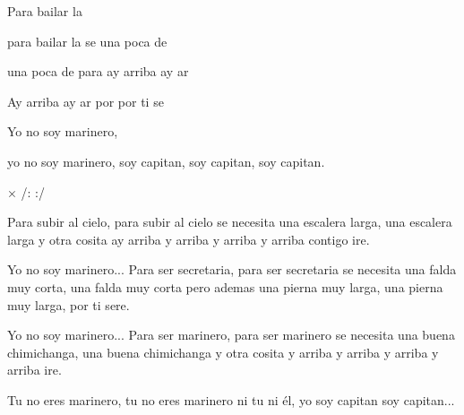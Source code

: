 
\zs
Para bailar la  

para bailar la  se 
una poca de  

una poca de  para  
ay arriba ay ar  

Ay arriba ay ar por 
por ti se 

Yo no soy marinero,

yo no soy marinero, soy capitan,
soy capitan, soy capitan.
\ks

× /:   :/
\kr

\zs
Para subir al cielo,
para subir al cielo se necesita una escalera larga,
una escalera larga y otra cosita ay arriba y arriba
y arriba y arriba contigo ire.

Yo no soy marinero...
\ks
\zr    \kr
\zs
Para ser secretaria,
para ser secretaria se necesita una falda muy corta,
una falda muy corta pero ademas una pierna muy larga,
una pierna muy larga, por ti sere.

Yo no soy marinero...
\ks
\zs
Para ser marinero,
para ser marinero se necesita una buena chimichanga,
una buena chimichanga y otra cosita y arriba y arriba
y arriba y arriba ire.

Tu no eres marinero, tu no eres marinero ni tu ni él,
yo soy capitan soy capitan...
\ks
\kp


